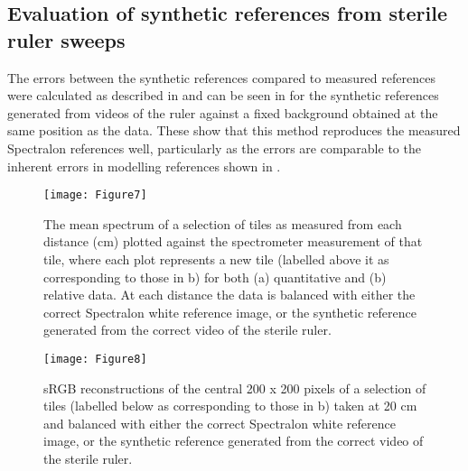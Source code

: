 \subsection{Evaluation of synthetic references from sterile ruler sweeps}
\label{resultssynthetic}
The errors between the synthetic references compared to measured references were calculated as described in  and can be seen in  for the synthetic references generated from videos of the ruler against a fixed background obtained at the same position as the data. These show that this method reproduces the measured Spectralon references well, particularly as the errors are comparable to the inherent errors in modelling references shown in .
\begin{figure}[htp!]
	\centering
        \texttt{[image: Figure7]}
 \caption{The mean spectrum of a selection of tiles as measured from each distance (cm) plotted against the spectrometer measurement of that tile, where each plot represents a new tile (labelled above it as corresponding to those in b) for both (a) quantitative and (b) relative data. At each distance the data is balanced with either the correct Spectralon white reference image, or the synthetic reference generated from the correct video of the sterile ruler.}
\end{figure}
\begin{figure}[htp!]
    \centering
    \texttt{[image: Figure8]}
    \caption{sRGB reconstructions of the central 200 x 200 pixels of a selection of tiles (labelled below as corresponding to those in b) taken at 20 cm and balanced with either the correct Spectralon white reference image, or the synthetic reference generated from the correct video of the sterile ruler.}
    \label{fig:summaryspectrasynthetic}
\end{figure}
% 
% 	
% 	
% 		
% 		
% 		
% 		
% 		
% 		
% 		
% 		
% 		
% 		
% 	
% 	
% 

